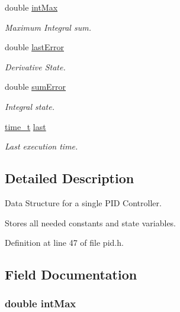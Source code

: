 \begin{DoxyCompactItemize}
double \hyperlink{struct_p_i_d_state_a85e14db5dc2af5e111772213512512e7}{int\-Max}
\begin{DoxyCompactList}\small\item\em Maximum Integral sum. \end{DoxyCompactList}\item 
double \hyperlink{struct_p_i_d_state_a16066d446d47c9e2ca1dadb75b5f439c}{last\-Error}
\begin{DoxyCompactList}\small\item\em Derivative State. \end{DoxyCompactList}\item 
double \hyperlink{struct_p_i_d_state_ac13ddfe17d63fa9b765378450d3d1b3f}{sum\-Error}
\begin{DoxyCompactList}\small\item\em Integral state. \end{DoxyCompactList}\item 
\hyperlink{group__time_ga02ad034d26db2c14b7e295b0c50fc11d}{time\-\_\-t} \hyperlink{struct_p_i_d_state_ad8672640f42e8308c593fafe968241f5}{last}
\begin{DoxyCompactList}\small\item\em Last execution time. \end{DoxyCompactList}\end{DoxyCompactItemize}


\subsection{Detailed Description}
Data Structure for a single P\-I\-D Controller. 

Stores all needed constants and state variables. 

Definition at line 47 of file pid.\-h.



\subsection{Field Documentation}
\hypertarget{struct_p_i_d_state_a85e14db5dc2af5e111772213512512e7}{
\subsubsection[{int\-Max}]{\setlength{\rightskip}{0pt plus 5cm}double int\-Max}}\label{struct_p_i_d_state_a85e14db5dc2af5e111772213512512e7}


